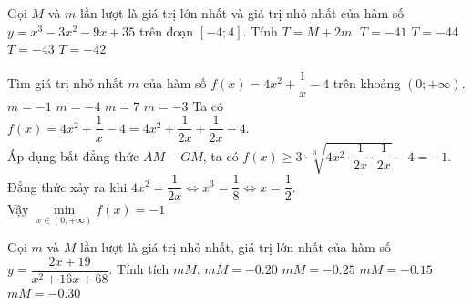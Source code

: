 \begin{ex}
\begin{ex}%
 Gọi $M$ và $m$ lần lượt là giá trị lớn nhất và giá trị nhỏ nhất của hàm số $y=x^3-3x^2-9x+35$ trên đoạn $\left[ -4;4\right]$. Tính $T=M+2m$.
 \choice
 {$T=-41$}
 {$T=-44$}
 {$T=-43$}
 {\True $T=-42$}
\end{ex}
\begin{ex}%
 Tìm giá trị nhỏ nhất $m$ của hàm số $f(x)= 4x^2+\dfrac{1}{x}-4$ trên khoảng $(0;+\infty)$.
 \choice
 {\True $m=-1$}
 {$m=-4$}
 {$m=7$}
 {$m=-3$}
 \loigiai
 { Ta có $f(x)=4x^2+\dfrac{1}{x}-4 =4x^2+\dfrac{1}{2x}+\dfrac{1}{2x} -4.$\\
 Áp dụng bất đẳng thức $AM-GM$, ta có $f(x) \geq 3\cdot \sqrt[3]{4x^2 \cdot \dfrac{1}{2x}\cdot \dfrac{1}{2x}} -4 =-1$.
 Đẳng thức xảy ra khi $4x^2=\dfrac{1}{2x} \Leftrightarrow x^3=\dfrac{1}{8} \Leftrightarrow x=\dfrac{1}{2}$.\\
 Vậy $\min\limits_{x\in (0;+\infty)} f(x) =-1$
 }
\end{ex}
\begin{ex}
 Gọi $m$ và $M$ lần lượt là giá trị nhỏ nhất, giá trị lớn nhất của hàm số $y=\dfrac{2x+19}{x^2+16x+68}$. Tính tích $mM$.
 \choice
 {$mM=-0.20$}
 {\True $mM=-0.25$}
 {$mM=-0.15$}
 {$mM=-0.30$}
\end{ex}

\end{ex}
